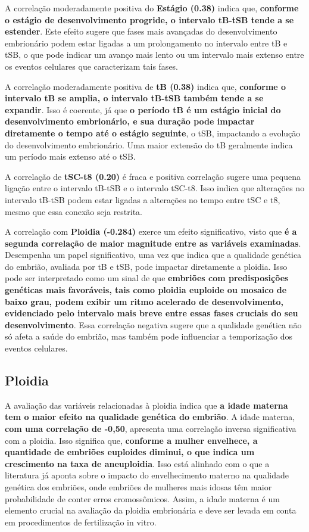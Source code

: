 A correlação moderadamente positiva do \textbf{Estágio (0.38)} indica que, \textbf{conforme o estágio de desenvolvimento progride, o intervalo tB-tSB tende a se estender}. Este efeito sugere que fases mais avançadas do desenvolvimento embrionário podem estar ligadas a um prolongamento no intervalo entre tB e tSB, o que pode indicar um avanço mais lento ou um intervalo mais extenso entre os eventos celulares que caracterizam tais fases.

A correlação moderadamente positiva de \textbf{tB (0.38)} indica que, \textbf{conforme o intervalo tB se amplia, o intervalo tB-tSB também tende a se expandir}. Isso é coerente, já que \textbf{o período tB é um estágio inicial do desenvolvimento embrionário, e sua duração pode impactar diretamente o tempo até o estágio seguinte}, o tSB, impactando a evolução do desenvolvimento embrionário. Uma maior extensão do tB geralmente indica um período mais extenso até o tSB.

A correlação de \textbf{tSC-t8 (0.20)} é fraca e positiva correlação sugere uma pequena ligação entre o intervalo tB-tSB e o intervalo tSC-t8. Isso indica que alterações no intervalo tB-tSB podem estar ligadas a alterações no tempo entre tSC e t8, mesmo que essa conexão seja restrita. 

A correlação com \textbf{Ploidia (-0.284)} exerce um efeito significativo, visto que \textbf{é a segunda correlação de maior magnitude entre as variáveis examinadas}. Desempenha um papel significativo, uma vez que indica que a qualidade genética do embrião, avaliada por tB e tSB, pode impactar diretamente a ploidia. Isso pode ser interpretado como um sinal de que \textbf{embriões com predisposições genéticas mais favoráveis, tais como ploidia euploide ou mosaico de baixo grau, podem exibir um ritmo acelerado de desenvolvimento, evidenciado pelo intervalo mais breve entre essas fases cruciais do seu desenvolvimento}. Essa correlação negativa sugere que a qualidade genética não só afeta a saúde do embrião, mas também pode influenciar a temporização dos eventos celulares. 

\subsection*{Ploidia}
A avaliação das variáveis relacionadas à ploidia indica que \textbf{a idade materna tem o maior efeito na qualidade genética do embrião}. A idade materna, \textbf{com uma correlação de -0,50}, apresenta uma correlação inversa significativa com a ploidia. Isso significa que, \textbf{conforme a mulher envelhece, a quantidade de embriões euploides diminui, o que indica um crescimento na taxa de aneuploidia}. Isso está alinhado com o que a literatura já aponta sobre o impacto do envelhecimento materno na qualidade genética dos embriões, onde embriões de mulheres mais idosas têm maior probabilidade de conter erros cromossômicos. Assim, a idade materna é um elemento crucial na avaliação da ploidia embrionária e deve ser levada em conta em procedimentos de fertilização in vitro.

